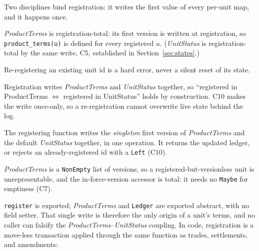Two disciplines bind registration: it writes the first value of every per-unit map, and it happens once.

\begin{condition}
\label{cond:C7}
\sloppy
\emph{ProductTerms} is registration-total: its first version is written at registration, so \texttt{product\_terms(u)} is defined for every registered $u$. (\emph{UnitStatus} is registration-total by the same write, C5, established in Section~\ref{sec:states}.)
\end{condition}

\begin{condition}[C10: no re-registration]
\label{cond:C10}
Re-registering an existing unit id is a hard error, never a silent reset of its state.
\end{condition}

Registration writes \emph{ProductTerms} and \emph{UnitStatus} together, so ``registered in ProductTerms $\iff$ registered in UnitStatus'' holds by construction. C10 makes the write once-only, so a re-registration cannot overwrite live state behind the log.

The registering function writes the \emph{singleton} first version of \emph{ProductTerms} and the default \emph{UnitStatus} together, in one operation. It returns the updated ledger, or rejects an already-registered id with a \texttt{Left} (C10).

\emph{ProductTerms} is a \texttt{NonEmpty} list of versions, so a registered-but-versionless unit is unrepresentable, and the in-force-version accessor is total: it needs no \texttt{Maybe} for emptiness (C7).

\texttt{register} is exported; \emph{ProductTerms} and \texttt{Ledger} are exported abstract, with no field setter. That single write is therefore the only origin of a unit's terms, and no caller can falsify the \emph{ProductTerms}--\emph{UnitStatus} coupling. In code, registration is a move-less transaction applied through the same function as trades, settlements, and amendments:

